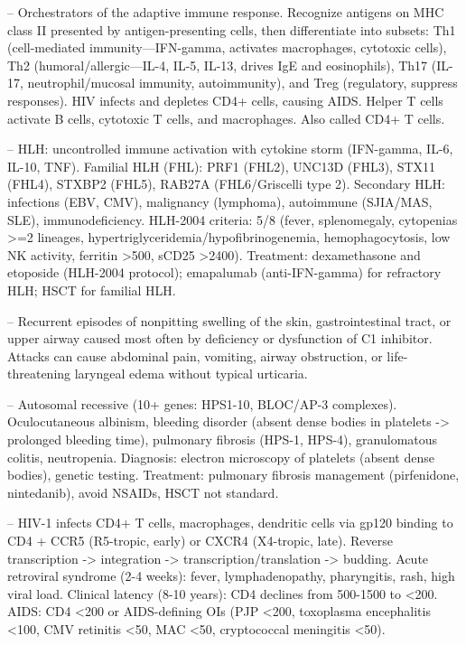 -- Orchestrators of the adaptive immune response. Recognize antigens on MHC class II presented by antigen-presenting cells, then differentiate into subsets: Th1 (cell-mediated immunity—IFN-gamma, activates macrophages, cytotoxic cells), Th2 (humoral/allergic—IL-4, IL-5, IL-13, drives IgE and eosinophils), Th17 (IL-17, neutrophil/mucosal immunity, autoimmunity), and Treg (regulatory, suppress responses). HIV infects and depletes CD4+ cells, causing AIDS. Helper T cells activate B cells, cytotoxic T cells, and macrophages. Also called CD4+ T cells.

-- HLH: uncontrolled immune activation with cytokine storm (IFN-gamma, IL-6, IL-10, TNF). Familial HLH (FHL): PRF1 (FHL2), UNC13D (FHL3), STX11 (FHL4), STXBP2 (FHL5), RAB27A (FHL6/Griscelli type 2). Secondary HLH: infections (EBV, CMV), malignancy (lymphoma), autoimmune (SJIA/MAS, SLE), immunodeficiency. HLH-2004 criteria: 5/8 (fever, splenomegaly, cytopenias >=2 lineages, hypertriglyceridemia/hypofibrinogenemia, hemophagocytosis, low NK activity, ferritin >500, sCD25 >2400). Treatment: dexamethasone and etoposide (HLH-2004 protocol); emapalumab (anti-IFN-gamma) for refractory HLH; HSCT for familial HLH.

-- Recurrent episodes of nonpitting swelling of the skin, gastrointestinal tract, or upper airway caused most often by deficiency or dysfunction of C1 inhibitor. Attacks can cause abdominal pain, vomiting, airway obstruction, or life-threatening laryngeal edema without typical urticaria.

-- Autosomal recessive (10+ genes: HPS1-10, BLOC/AP-3 complexes). Oculocutaneous albinism, bleeding disorder (absent dense bodies in platelets -> prolonged bleeding time), pulmonary fibrosis (HPS-1, HPS-4), granulomatous colitis, neutropenia. Diagnosis: electron microscopy of platelets (absent dense bodies), genetic testing. Treatment: pulmonary fibrosis management (pirfenidone, nintedanib), avoid NSAIDs, HSCT not standard.

-- HIV-1 infects CD4+ T cells, macrophages, dendritic cells via gp120 binding to CD4 + CCR5 (R5-tropic, early) or CXCR4 (X4-tropic, late). Reverse transcription -> integration -> transcription/translation -> budding. Acute retroviral syndrome (2-4 weeks): fever, lymphadenopathy, pharyngitis, rash, high viral load. Clinical latency (8-10 years): CD4 declines from 500-1500 to <200. AIDS: CD4 <200 or AIDS-defining OIs (PJP <200, toxoplasma encephalitis <100, CMV retinitis <50, MAC <50, cryptococcal meningitis <50).

